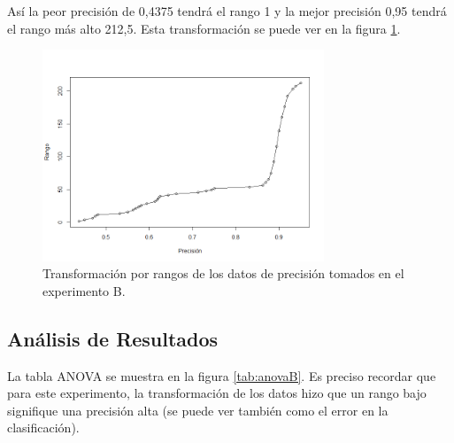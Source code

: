 Así la peor precisión de 0,4375 tendrá el rango 1 y la mejor precisión 0,95 tendrá el rango más alto 212,5. Esta transformación se puede ver en la figura \ref{fig:rank-p}.


\begin{figure}[H]
    \centering
    \includegraphics[width=0.75\textwidth]{images/p/rank.png}
    \caption{Transformación por rangos de los datos de precisión tomados en el experimento B.}
    \label{fig:rank-p}
\end{figure}


\subsection{Análisis de Resultados}

La tabla ANOVA se muestra en la figura \ref{tab:anovaB}.
Es preciso recordar que para este experimento, la transformación de los datos hizo que un rango bajo signifique una precisión alta (se puede ver también como el error en la clasificación).



